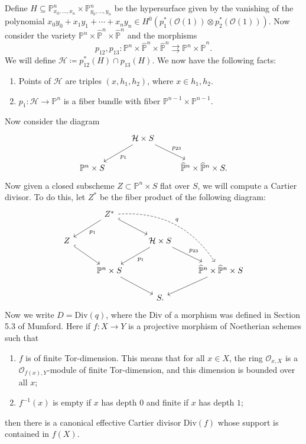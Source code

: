 \documentclass[leqno, openany]{memoir}
\theoremstyle{definition}
\theoremstyle{remark}
\theoremstyle{plain}
\theoremstyle{definition}
\theoremstyle{remark}
\renewcommand{\P}{\mathbb{P}}
\newcommand{\mc}[1]{\mathcal{#1}}
\newcommand{\mr}[1]{\mathrm{#1}}
\newcommand{\wh}[1]{\widehat{#1}}
\begin{document}
Define $H \subseteq \P^n_{x_0, \ldots, x_n} \times \P^n_{y_0, \ldots, y_n}$ be the hypersurface given by the vanishing of the polynomial $x_0 y_0 + x_1 y_1 + \cdots + x_n y_n \in H^0(p_1^*(\mc{O}(1)) \otimes p_2^*(\mc{O}(1)))$. Now consider the variety $\P^n \times \wh{\P}^n \times \wh{\P}^n$ and the morphisms
\[ p_{12}, p_{13} \colon \P^n \times \wh{\P}^n \times \wh{\P}^n \rightrightarrows \P^n \times \wh{\P}^n. \]
We will define $\mc{H} \coloneqq p_{12}^*(H) \cap p_{13}(H)$. We now have the following facts:
\begin{enumerate}
    \item Points of $\mc{H}$ are triples $(x, h_1, h_2)$, where $x \in h_1, h_2$.
    \item $p_1 \colon \mc{H} \to \P^n$ is a fiber bundle with fiber $\P^{n-1} \times \P^{n-1}$.
\end{enumerate}
Now consider the diagram
\begin{equation*}
\begin{tikzcd}
    & \mc{H} \times S \arrow{dl}{p_1} \arrow{dr}{p_{23}} \\
    \P^n \times S & & \wh{\P}^n \times \wh{\P}^n \times S.
\end{tikzcd}
\end{equation*}
Now given a closed subscheme $Z \subset \P^n \times S$ flat over $S$, we will compute a Cartier divisor. To do this, let $Z^*$ be the fiber product of the following diagram:
\begin{equation*}
\begin{tikzcd}
    & Z^* \arrow{dl}{p_1} \arrow[hookrightarrow]{dr} \arrow[bend left=30, dashrightarrow]{ddrr}{q} \\
    Z \arrow[hookrightarrow]{dr} & & \mc{H} \times S \arrow{dl}{p_1} \arrow{dr}{p_{23}} \\
                                 & \P^n \times S \arrow{dr} & & \wh{\P}^n \times \wh{\P}^n \times S \arrow{dl} \\
                                 & & S.
\end{tikzcd}
\end{equation*}
Now we write $D = \mr{Div}(q)$, where the Div of a morphism was defined in Section 5.3 of Mumford. Here if $f \colon X \to Y$ is a projective morphism of Noetherian schemes such that
\begin{enumerate}
    \item $f$ is of finite Tor-dimension. This means that for all $x \in X$, the ring $\mc{O}_{x,X}$ is a $\mc{O}_{f(x), Y}$-module of finite Tor-dimension, and this dimension is bounded over all $x$;
    \item $f^{-1}(x)$ is empty if $x$ has depth $0$ and finite if $x$ has depth $1$;
\end{enumerate}
then there is a canonical effective Cartier divisor $\mr{Div}(f)$ whose support is contained in $f(X)$.
\end{document}
